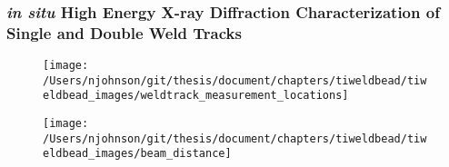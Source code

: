 \subsubsection{\textit{in situ} High Energy X-ray Diffraction Characterization of Single and Double Weld Tracks}
\begin{figure}
	\texttt{[image: /Users/njohnson/git/thesis/document/chapters/tiweldbead/tiweldbead\_images/weldtrack\_measurement\_locations]}
	\caption{}
	\label{weldtrack_measurement_locations}
\end{figure}
%
\begin{figure}
	\texttt{[image: /Users/njohnson/git/thesis/document/chapters/tiweldbead/tiweldbead\_images/beam\_distance]}
	\caption{}
	\label{beam_distance}
\end{figure}